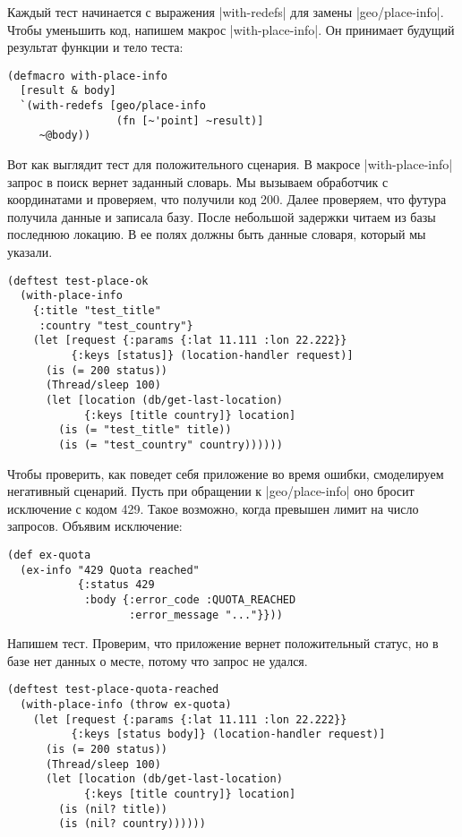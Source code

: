 Каждый тест начинается с выражения \spverb|with-redefs| для замены
\spverb|geo/place-info|. Чтобы уменьшить код, напишем макрос
\spverb|with-place-info|. Он принимает будущий результат функции и тело теста:

\begin{verbatim}
(defmacro with-place-info
  [result & body]
  `(with-redefs [geo/place-info
                 (fn [~'point] ~result)]
     ~@body))
\end{verbatim}

Вот как выглядит тест для положительного сценария. В макросе
\spverb|with-place-info| запрос в поиск вернет заданный словарь. Мы вызываем
обработчик с координатами и проверяем, что получили код 200. Далее проверяем,
что футура получила данные и записала базу. После небольшой задержки читаем из
базы последнюю локацию. В ее полях должны быть данные словаря, который мы
указали.

\begin{verbatim}
(deftest test-place-ok
  (with-place-info
    {:title "test_title"
     :country "test_country"}
    (let [request {:params {:lat 11.111 :lon 22.222}}
          {:keys [status]} (location-handler request)]
      (is (= 200 status))
      (Thread/sleep 100)
      (let [location (db/get-last-location)
            {:keys [title country]} location]
        (is (= "test_title" title))
        (is (= "test_country" country))))))
\end{verbatim}

Чтобы проверить, как поведет себя приложение во время ошибки, смоделируем
негативный сценарий. Пусть при обращении к \spverb|geo/place-info| оно бросит
исключение с кодом 429. Такое возможно, когда превышен лимит на число
запросов. Объявим исключение:

\begin{verbatim}
(def ex-quota
  (ex-info "429 Quota reached"
           {:status 429
            :body {:error_code :QUOTA_REACHED
                   :error_message "..."}}))
\end{verbatim}

Напишем тест. Проверим, что приложение вернет положительный статус, но в базе
нет данных о месте, потому что запрос не удался.

\begin{verbatim}
(deftest test-place-quota-reached
  (with-place-info (throw ex-quota)
    (let [request {:params {:lat 11.111 :lon 22.222}}
          {:keys [status body]} (location-handler request)]
      (is (= 200 status))
      (Thread/sleep 100)
      (let [location (db/get-last-location)
            {:keys [title country]} location]
        (is (nil? title))
        (is (nil? country))))))
\end{verbatim}

